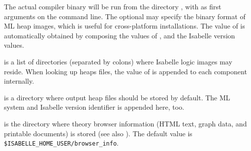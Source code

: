 \begin{isabellebody}
\begin{isamarkuptext}
\begin{description}
  The actual compiler binary will be run from the directory \hyperlink{setting.ML-HOME}{\mbox{}}, with \hyperlink{setting.ML-OPTIONS}{\mbox{}} as first arguments on the
  command line.  The optional \hyperlink{setting.ML-PLATFORM}{\mbox{}} may specify the
  binary format of ML heap images, which is useful for cross-platform
  installations.  The value of \hyperlink{setting.ML-IDENTIFIER}{\mbox{}} is
  automatically obtained by composing the values of \hyperlink{setting.ML-SYSTEM}{\mbox{}}, \hyperlink{setting.ML-PLATFORM}{\mbox{}} and the Isabelle version values.
  
  \item[\indexdef{}{setting}{ISABELLE\_PATH}\hypertarget{setting.ISABELLE-PATH}{\hyperlink{setting.ISABELLE-PATH}{\mbox{\isa{\isatt{ISABELLE{\isaliteral{5F}{\isacharunderscore}}PATH}}}}}] is a list of directories
  (separated by colons) where Isabelle logic images may reside.  When
  looking up heaps files, the value of \hyperlink{setting.ML-IDENTIFIER}{\mbox{}} is
  appended to each component internally.
  
  \item[\indexdef{}{setting}{ISABELLE\_OUTPUT}\hypertarget{setting.ISABELLE-OUTPUT}{\hyperlink{setting.ISABELLE-OUTPUT}{\mbox{\isa{\isatt{ISABELLE{\isaliteral{5F}{\isacharunderscore}}OUTPUT}}}}}\isa{{\isaliteral{22}{\isachardoublequote}}\isaliteral{5C3C5E7375703E}{}\isactrlsup {\isaliteral{2A}{\isacharasterisk}}{\isaliteral{22}{\isachardoublequote}}}] is a
  directory where output heap files should be stored by default. The
  ML system and Isabelle version identifier is appended here, too.
  
  \item[\indexdef{}{setting}{ISABELLE\_BROWSER\_INFO}\hypertarget{setting.ISABELLE-BROWSER-INFO}{\hyperlink{setting.ISABELLE-BROWSER-INFO}{\mbox{\isa{\isatt{ISABELLE{\isaliteral{5F}{\isacharunderscore}}BROWSER{\isaliteral{5F}{\isacharunderscore}}INFO}}}}}] is the directory where
  theory browser information (HTML text, graph data, and printable
  documents) is stored (see also ).  The default
  value is \verb|$ISABELLE_HOME_USER/browser_info|.
  

\end{description}
\end{isamarkuptext}
\end{isabellebody}
